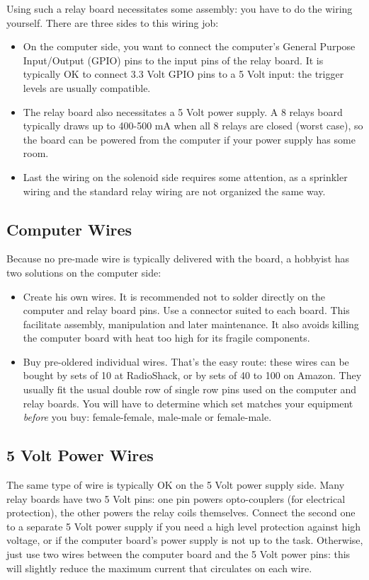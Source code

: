 \documentclass[11pt]{book}
\begin{document}
Using such a relay board necessitates some assembly: you have to do the wiring yourself. There are three sides to this wiring job:
\begin{itemize}
\item On the computer side, you want to connect the computer's General Purpose Input/Output (GPIO) pins to the input pins of the relay board. It is typically OK to connect 3.3 Volt GPIO pins to a 5 Volt input: the trigger levels are usually compatible.
\item The relay board also necessitates a 5 Volt power supply. A 8 relays board typically draws up to 400-500 mA when all 8 relays are closed (worst case), so the board can be powered from the computer if your power supply has some room.
\item Last the wiring on the solenoid side requires some attention, as a sprinkler wiring and the standard relay wiring are not organized the same way.
\end{itemize}
\subsection{Computer Wires}
Because no pre-made wire is typically delivered with the board, a hobbyist has two solutions on the computer side:
\begin{itemize}
\item Create his own wires. It is recommended not to solder directly on the computer and relay board pins. Use a connector suited to each board. This facilitate assembly, manipulation and later maintenance. It also avoids killing the computer board with heat too high for its fragile components.
\item Buy pre-oldered individual wires. That's the easy route: these wires can be bought by sets of 10 at RadioShack, or by sets of 40 to 100 on Amazon. They usually fit the usual double row of single row pins used on the computer and relay boards. You will have to determine which set matches your equipment \emph{before} you buy: female-female, male-male or female-male.
\end{itemize}
\subsection{5 Volt Power Wires}
The same type of wire is typically OK on the 5 Volt power supply side. Many relay boards have two 5 Volt pins: one pin powers opto-couplers (for electrical protection), the other powers the relay coils themselves. Connect the second one to a separate 5 Volt power supply if you need a high level protection against high voltage, or if the computer board's power supply is not up to the task. Otherwise, just use two wires between the computer board and the 5 Volt power pins: this will slightly reduce the maximum current that circulates on each wire.
\end{document}
